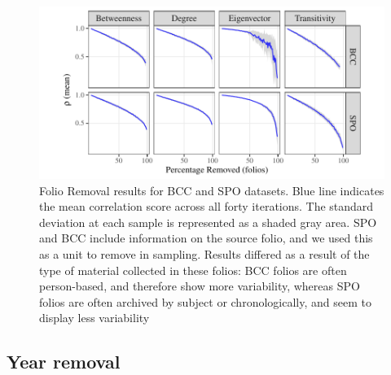 \documentclass[]{article}
\begin{document}
\begin{figure}

{\centering \includegraphics{network_robustness_article_anon_files/figure-latex/folio-1} 

}

\caption{Folio Removal results for BCC and SPO datasets. Blue line indicates the mean correlation score across all forty iterations. The standard deviation at each sample is represented as a shaded gray area. SPO and BCC include information on the source folio, and we used this as a unit to remove in sampling. Results differed as a result of the type of material collected in these folios: BCC folios are often person-based, and therefore show more variability, whereas SPO folios are often archived by subject or chronologically, and seem to display less variability}\label{fig:folio}
\end{figure}

\hypertarget{year-removal}{%
\subsection{Year removal}\label{year-removal}}
\end{document}
